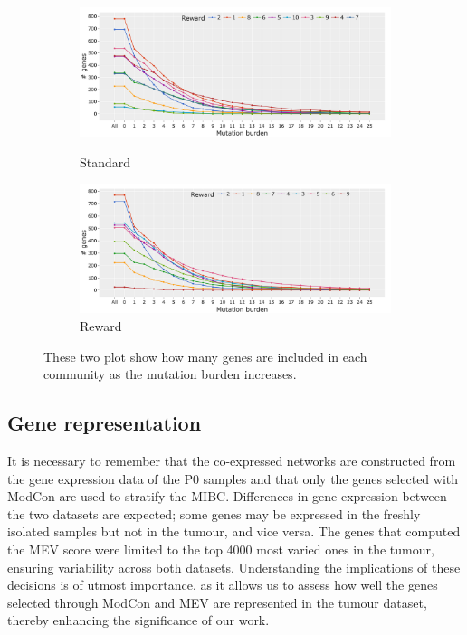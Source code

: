 \begin{figure}[!htb]
    \centering
    \begin{subfigure}[b]{1.0\textwidth}
        \includegraphics[width=\textwidth,keepaspectratio]{Sections/Network_I/Resources/P0/Comms/Mut_evo_Std_4k_v3.png}
        \label{fig:N_I:p0_std_mut_burden}
        \caption{Standard}
    \end{subfigure}
    \begin{subfigure}[b]{1.0\textwidth}
        \includegraphics[width=\textwidth,keepaspectratio]{Sections/Network_I/Resources/P0/Comms/Mut_evo_Rwd_4k_v3.png}
        \caption{Reward}
        \label{fig:N_I:p0_rwd_mut_burden}
    \end{subfigure}
    \caption[Mutation burden per communities]{These two plot show how many genes are included in each community as the mutation burden increases.}
    \label{fig:N_I:p0_mut_burden}
\end{figure}


\subsection{Gene representation} \label{s:N_I:gene_rep}

It is necessary to remember that the co-expressed networks are constructed from the gene expression data of the P0 samples and that only the genes selected with ModCon are used to stratify the MIBC. Differences in gene expression between the two datasets are expected; some genes may be expressed in the freshly isolated samples but not in the tumour, and vice versa. The genes that computed the MEV score were limited to the top 4000 most varied ones in the tumour, ensuring variability across both datasets. Understanding the implications of these decisions is of utmost importance, as it allows us to assess how well the genes selected through ModCon and MEV are represented in the tumour dataset, thereby enhancing the significance of our work.

